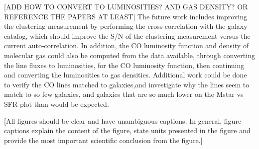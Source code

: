 \documentclass[twoside,single]{lion-msc}
\begin{document}
[ADD HOW TO CONVERT TO LUMINOSITIES? AND GAS DENSITY? OR REFERENCE THE PAPERS AT LEAST]
The future work includes improving the clustering measurement by performing the cross-correlation with the galaxy catalog, which should improve the S/N of the clustering measurement versus the current auto-correlation. In addition, the CO luminosity function and density of molecular gas could also be computed from the data available, through converting the line fluxes to luminosities, for the CO luminosity function, then continuing and converting the luminosities to gas densities. Additional work could be done to verify the CO lines matched to galaxies,and investigate why the lines seem to match to so few galaxies, and galaxies that are so much lower on the Mstar vs SFR plot than would be expected. 

[All figures should be clear and have unambiguous captions. In general, figure captions explain the content of the figure, state units presented in the figure and provide the most important scientific conclusion from the figure.]

\appendix



\end{document}
